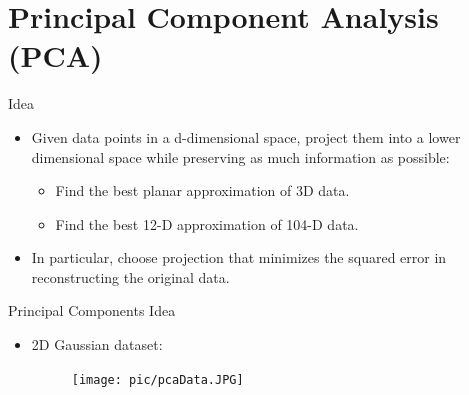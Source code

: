 \documentclass[serif, aspectratio=169]{beamer}
\begin{document}
\section{Principal Component Analysis (PCA)}

\begin{frame}{Idea}
    \begin{itemize}
        \item Given data points in a d-dimensional space, project them into a lower dimensional space while preserving as much information as possible:
        \begin{itemize}
            \item Find the best planar approximation of 3D data.
            \item Find the best 12-D approximation of 104-D data.
        \end{itemize}
        \item In particular, choose projection that minimizes the squared error in reconstructing the original data.
    \end{itemize}
\end{frame}

\begin{frame}{Principal Components Idea}
    \begin{itemize}
        \item 2D Gaussian dataset:
         \begin{figure}[htpb]
            \begin{center}
                \texttt{[image: pic/pcaData.JPG]}
            \end{center}
        \end{figure}
    \end{itemize}
\end{frame}
\end{document}
